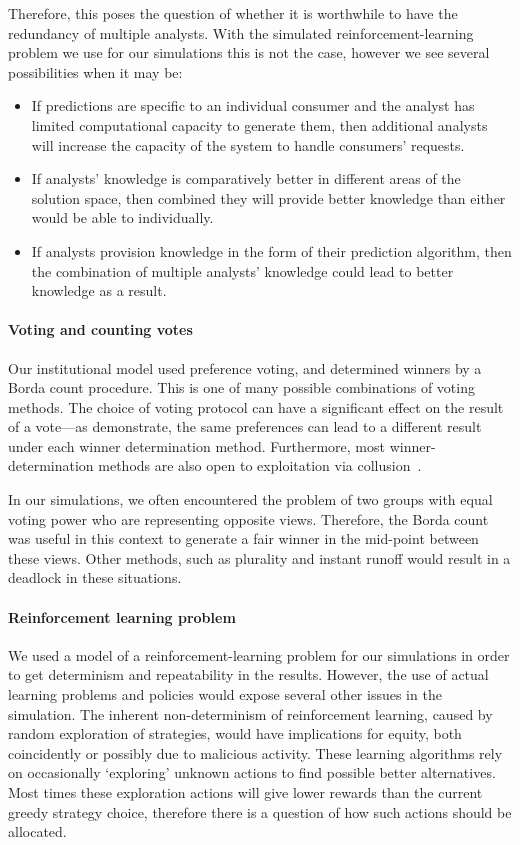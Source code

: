 Therefore, this poses the question of whether it is worthwhile to have the
redundancy of multiple analysts. With the simulated reinforcement-learning
problem we use for our simulations this is not the case, however we see several possibilities when
it may be:

\begin{itemize}
\item If predictions are specific to an individual consumer and the analyst has limited computational capacity to generate them, then additional analysts will increase the capacity of the system to handle consumers' requests.
\item If analysts' knowledge is comparatively better in different areas of the solution space, then combined they will provide better knowledge than either would be able to individually.
\item If analysts provision knowledge in the form of their prediction algorithm, then the combination of multiple analysts' knowledge could lead to better knowledge as a result. 
\end{itemize}

\paragraph{Voting and counting votes} Our institutional model used preference
voting, and determined winners by a Borda count procedure. This is one of many
possible combinations of voting methods. The choice of voting protocol can have
a significant effect on the result of a vote---as \citet{Pitt2011b}
demonstrate, the same preferences can lead to a different result under each
winner determination method. Furthermore, most winner-determination methods
are also open to exploitation via collusion~\citep{Conitzer2007}.

In our simulations, we often encountered the problem of two groups with equal
voting power who are representing opposite views. Therefore, the Borda count was
useful in this context to generate a fair winner in the mid-point between
these views. Other methods, such as plurality and instant runoff would result
in a deadlock in these situations.

\paragraph{Reinforcement learning problem} We used a model of a 
reinforcement-learning problem for our simulations in order to get determinism and
repeatability in the results. However, the use of actual learning problems and
policies would expose several other issues in the simulation. The inherent
non-determinism of reinforcement learning, caused by random exploration of strategies,
would have implications for equity,
both coincidently or possibly due to malicious activity. These learning
algorithms rely on occasionally `exploring' unknown actions to find possible
better alternatives. Most times these exploration actions will give lower
rewards than the current greedy strategy choice, therefore there is a question
of how such actions should be allocated.

